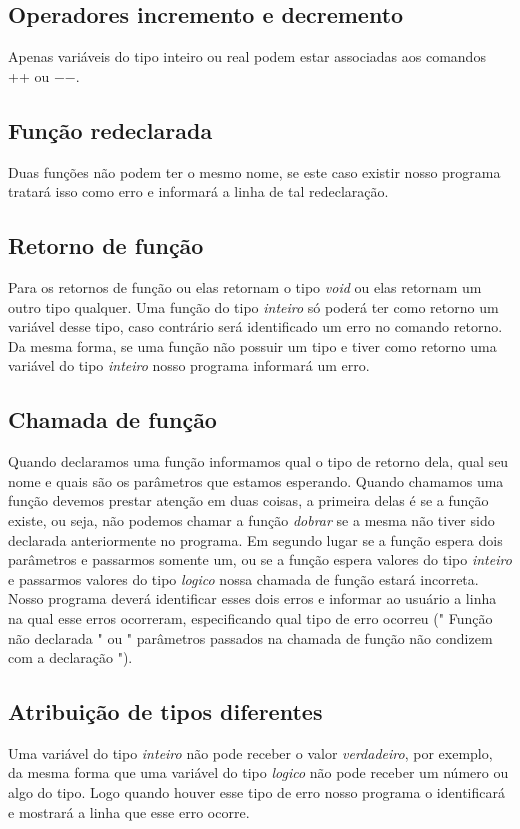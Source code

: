 \documentclass[
12pt,				%
a4paper,			%
english,			%
french,				%
spanish,			%
brazil,				%
article
]{abntex2}
\begin{document}
\subsection{Operadores incremento e decremento}
Apenas variáveis do tipo inteiro ou real podem estar associadas aos comandos ++ ou \textit{$-$$-$}.

\subsection{Função redeclarada}
Duas funções não podem ter o mesmo nome, se este caso existir nosso programa tratará isso como erro e informará a linha de tal redeclaração.

\subsection{Retorno de função}
Para os retornos de função ou elas retornam o tipo \textit{void} ou elas retornam um outro tipo qualquer. Uma função do tipo \textit{inteiro} só poderá ter como retorno um variável desse tipo, caso contrário será identificado um erro no comando retorno. Da mesma forma, se uma função não possuir um tipo e tiver como retorno uma variável do tipo \textit{inteiro} nosso programa informará um erro.

\subsection{Chamada de função}
Quando declaramos uma função informamos qual o tipo de retorno dela, qual seu nome e quais são os parâmetros que estamos esperando. Quando chamamos uma função devemos prestar atenção em duas coisas, a primeira delas é se a função existe, ou seja, não podemos chamar a função \textit{dobrar} se a mesma não tiver sido declarada anteriormente no programa. Em segundo lugar se a função espera dois parâmetros e passarmos somente um, ou se a função espera valores do tipo \textit{inteiro} e passarmos valores do tipo \textit{logico} nossa chamada de função estará incorreta. Nosso programa deverá identificar esses dois erros e informar ao usuário a linha na qual esse erros ocorreram, especificando qual tipo de erro ocorreu (" Função não declarada " ou " parâmetros passados na chamada de função não condizem com a declaração ").

\subsection{Atribuição de tipos diferentes}
Uma variável do tipo \textit{inteiro} não pode receber o valor \textit{verdadeiro}, por exemplo, da mesma forma que uma variável do tipo \textit{logico} não pode receber um número ou algo do tipo. Logo quando houver esse tipo de erro nosso programa o identificará e mostrará a linha que esse erro ocorre.
\end{document}
